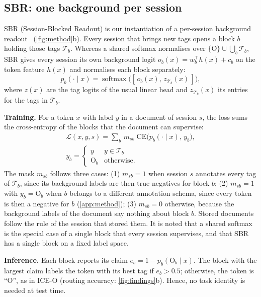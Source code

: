 \documentclass[10pt,twocolumn,letterpaper]{article}
\newcommand{\runin}[1]{\par\addvspace{0.7ex plus .3ex minus .1ex}\noindent\textbf{#1}\hspace{1em}\ignorespaces}
\begin{document}
\subsection{SBR: one background per session}
\label{sec:sbr}
SBR (Session-Blocked Readout) is our instantiation of a per-session background readout~\citep{liu2023ice,kim2022more} (\cref{fig:method}b). Every session that brings new tags opens a block $b$ holding those tags $\mathcal{T}_b$. Whereas a shared softmax normalises over $\{\mathrm{O}\}\cup\bigcup_b\mathcal{T}_b$, SBR gives every session its own background logit $o_b(x)=w_b^{\top}h(x)+c_b$ on the token feature $h(x)$ and normalises each block separately:
\begin{equation}
p_b(\cdot\mid x)=\operatorname{softmax}\big([\,o_b(x),\,z_{\mathcal{T}_b}(x)\,]\big),
\label{eq:block}
\end{equation}
where $z(x)$ are the tag logits of the usual linear head and $z_{\mathcal{T}_b}(x)$ its entries for the tags in $\mathcal{T}_b$.

\runin{Training.} For a token $x$ with label $y$ in a document of session $s$, the loss sums the cross-entropy of the blocks that the document can supervise:
\begin{equation}
\begin{gathered}
\mathcal{L}(x,y,s)=\sum_{b}\,m_{sb}\;\mathrm{CE}\big(p_b(\cdot\mid x),\,y_b\big),\\
y_b=\begin{cases} y & y\in\mathcal{T}_b\\ \mathrm{O}_b & \text{otherwise.}\end{cases}
\end{gathered}
\label{eq:sbr}
\end{equation}
The mask $m_{sb}$ follows three cases: (1) $m_{sb}{=}1$ when session $s$ annotates every tag of $\mathcal{T}_b$, since its background labels are then true negatives for block $b$; (2) $m_{sb}{=}1$ with $y_b{=}\mathrm{O}_b$ when $b$ belongs to a different annotation schema, since every token is then a negative for $b$ (\cref{app:method}); (3) $m_{sb}{=}0$ otherwise, because the background labels of the document say nothing about block $b$. Stored documents follow the rule of the session that stored them. It is noted that a shared softmax is the special case of a single block that every session supervises, and that SBR has a single block on a fixed label space.

\runin{Inference.} Each block reports its claim $e_b=1-p_b(\mathrm{O}_b\mid x)$. The block with the largest claim labels the token with its best tag if $e_b>0.5$; otherwise, the token is ``O'', as in ICE-O (routing accuracy: \cref{fig:findings}b). Hence, no task identity is needed at test time.
\end{document}
